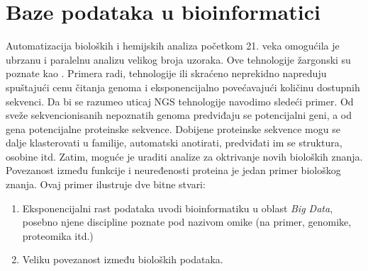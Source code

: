 \chapter{Baze podataka u bioinformatici} %

\label{Baze} %

Automatizacija bioloških i hemijskih analiza početkom 21. veka omogućila je
ubrzanu i paralelnu analizu velikog broja uzoraka. Ove tehnologije žargonski su
poznate kao  . Primera radi, tehnologije 
 ili skraćeno  neprekidno napreduju
spuštajući cenu čitanja genoma i eksponencijalno povećavajući količinu dostupnih
sekvenci. Da bi se razumeo uticaj NGS tehnologije navodimo sledeći primer.
Od sveže sekvencionisanih nepoznatih genoma predviđaju se
potencijalni geni, a od gena potencijalne proteinske sekvence.  Dobijene
proteinske sekvence mogu se dalje klasterovati u familije, automatski
anotirati, predviđati im se struktura, osobine itd.  Zatim, moguće je uraditi
analize za oktrivanje novih bioloških znanja. Povezanost između funkcije i
neuređenosti proteina je jedan primer biološkog znanja. 
Ovaj primer ilustruje dve bitne stvari:
\begin{enumerate}
  \item Eksponencijalni rast podataka uvodi bioinformatiku u oblast \textit{Big Data},
    posebno njene discipline poznate pod nazivom omike (na primer, genomike, proteomika itd.)
  \item Veliku povezanost između bioloških podataka.
\end{enumerate}

